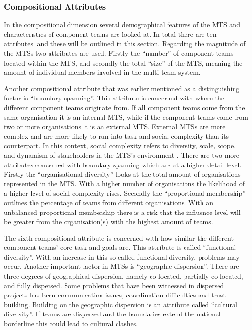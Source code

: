 \subsubsection{Compositional Attributes}

In the compositional dimension several demographical features of the MTS and characteristics of component teams are looked at. In total there are ten attributes, and these will be outlined in this section. Regarding the magnitude of the MTSs two attributes are used. Firstly the ``number'' of component teams located within the MTS, and secondly the total ``size'' of the MTS, meaning the amount of individual members involved in the multi-team system.

Another compositional attribute that was earlier mentioned as a distinguishing factor is ``boundary spanning''. This attribute is concerned with where the different component teams originate from. If all component teams come from the same organisation it is an internal MTS, while if the component teams come from two or more organisations it is an external MTS. External MTSs are more complex and are more likely to run into task and social complexity than its counterpart. In this context, social complexity refers to diversity, scale, scope, and dynamism of stakeholders in the MTS's environment \cite{bentz1987explorations, zaccaro2001nature}. There are two more attributes concerned with boundary spanning which are at a higher detail level. Firstly the ``organisational diversity'' looks at the total amount of organisations represented in the MTS. With a higher number of organisations the likelihood of a higher level of social complexity rises. Secondly the ``proportional membership'' outlines the percentage of teams from different organisations. With an unbalanced proportional membership there is a risk that the influence level will be greater from the organisation(s) with the highest amount of teams.

The sixth compositional attribute is concerned with how similar the different component teams' core task and goals are. This attribute is called ``functional diversity''. With an increase in this so-called functional diversity, problems may occur. Another important factor in MTSs is ``geographic dispersion''. There are three degrees of geographical dispersion, namely co-located, partially co-located, and fully dispersed. Some problems that have been witnessed in dispersed projects has been communication issues, coordination difficulties and trust building. Building on the geographic dispersion is an attribute called ``cultural diversity''. If teams are dispersed and the boundaries extend the national borderline this could lead to cultural clashes.

